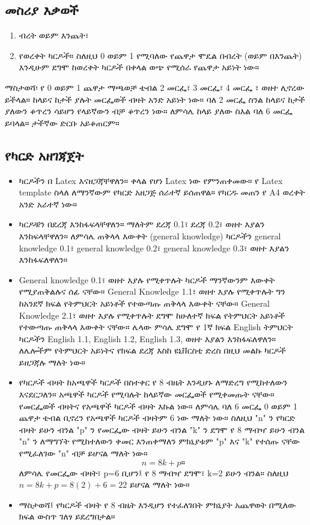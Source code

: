 \documentclass[a4paper,12pt]{article}
\newenvironment{geez}{\geezfont}{}
\begin{document}
\subsection{\begin{geez}መስሪያ እቃወች\end{geez}}
\begin{enumerate}
\item ብረት ወይም እንጨት፣
\item የወረቀት ካርዶች።
ስለዚህ 0 ወይም 1 የሚባለው የጨዋታ ሞዴል በብረት (ወይም በእንጨት) እንዲሁም ደግሞ ከወረቀት ካርዶች በቀላል ወጭ የሚሰራ የጨዋታ አይነት ነው።
\end{enumerate}
{\color{red}ማስታወሻ}፡ የ 0 ወይም 1 ጨዋታ ማጫወቻ ቴብል  2 መርፌ፣ 3 መርፌ፣ 4 መርፌ ፣ ወዘተ ሊኖረው ይችላል። ከላይና ከታች ያሉት መርፌወች ብዛት አንድ አይነት ነው። ባለ 2 መርፌ ስንል ከላይና ከታች ያለውን ቆጥረን ሳይሆን የላይኛውን ብቻ ቆጥረን ነው። ለምሳሌ ከላይ ያለው ስእል ባለ 6 መርፌ ይባላል። ታችኛው ድርቡ አይቆጠርም።
\subsection{\begin{geez}የካርድ አዘገጃጀት\end{geez}}
\begin{itemize}
\item \justify ካርዶችን በ Latex እናዘጋጃቸዋለን። ቀላል የሆነ Latex ነው የምንጠቀመው። የ Latex template ስላለ ለማንኛውም የካርድ አዘጋጅ ሰራተኛ ይሰጠዋል። የካርዱ መጠን የ A4 ወረቀት አንድ አራተኛ ነው።
\end{itemize}
\begin{itemize}
\item \justify ካርዶቹን በደረጃ እንከፋፍላቸዋለን። ማለትም ደረጃ 0.1፣ ደረጃ 0.2፣ ወዘተ እያልን እንከፍላቸዋለን። ለምሳሌ ጠቅላላ እውቀት (general knowledge) ካርዶችን general knowledge 0.1፣  general knowledge 0.2፣ general knowledge 0.3፣ ወዘተ እያልን እንከፋፍለዋለን። 
\end{itemize}
\begin{itemize}
\item \justify General knowledge 0.1፣ ወዘተ እያሉ የሚቀጥሉት ካርዶች ማንኛውንም እውቀት የሚያጠቅልሉና ሰፊ ናቸው። General Knowledge 1.1፣ ወዘተ እያሉ የሚቀጥሉት ግን ከአንደኛ ክፍል የትምህርት አይነቶች የተውጣጡ  ጠቅላላ እውቀት  ናቸው። General Knowledge 2.1፣ ወዘተ እያሉ የሚቀጥሉት ደግሞ ከሁለተኛ ክፍል የትምህርት አይነቶች የተውጣጡ  ጠቅላላ እውቀት  ናቸው።  ሌላው  ምሳሌ ደግሞ የ 1ኛ ክፍል English ትምህርት ካርዶችን  English 1.1, English 1.2, English 1.3, ወዘተ እያልን እንከፋፍለዋለን። ለሌሎችም የትምህርት አይነትና የክፍል ደረጃ እስከ ዩኒቨርስቲ ድረስ በዚህ መልኩ ካርዶች ይዘጋጃሉ ማለት ነው።
\end{itemize}
\begin{itemize}
\item \justify የካርዶች ብዛት ከአጫዋች ካርዶች በስተቀር የ 8 ብዜት እንዲሆኑ ለማድረግ የሚከተለውን እናደርጋለን። አጫዋች ካርዶች የሚባሉት ከላይኛው መርፌወች የሚቀመጡት ናቸው። የመርፌወች ብዛትና የአጫዋች ካርዶች ብዛት እኩል ነው። ለምሳሌ ባለ 6 መርፌ 0 ወይም 1 ጨዋታ ቴብል ቢኖረን የአጫዋች ካርዶች ብዛትም 6 ነው ማለት ነው።  ስለዚህ "n" ን የካርድ ብዛት ይሁን ብንል "p" ን የመርፌው ብዛት ይሁን ብንል "k" ን ደግሞ የ 8 ማብዣ ይሁን ብንል "n" ን ለማግኘት የሚከተለውን ቀመር እንጠቀማለን ምክኒያቱም "p" እና "k" የተሰጡ ናቸው የሚፈለገው "n" ብቻ ይሆናል ማለት ነው። 
$$n=8k+p።$$
ለምሳሌ የመርፌው ብዛት፣ p=6 ቢሆን፤ የ 8 ማብዣ ደግሞ፣ k=2 ይሁን ብንል። ስለዚህ $n=8k+p=8(2)+6=22$ ይሆናል ማለት ነው።
\end{itemize}
\begin{itemize}
\item {\color{red}ማስታወሻ}፤ የካርዶች ብዛት የ 8 ብዜት እንዲሆን የተፈለገበት ምክኒያት አጨዋወት በሚለው ክፍል ውስጥ ገለፃ ይደረግበታል። 
\end{itemize}
\end{document}
